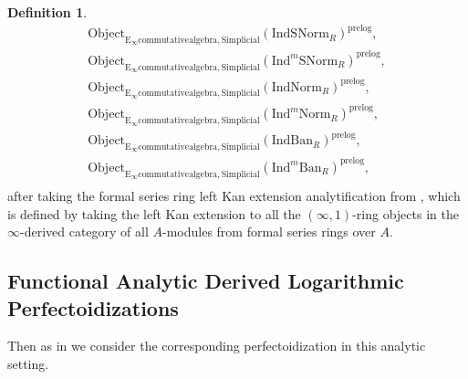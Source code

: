 \documentclass[11pt]{book}
\theoremstyle{definition}
\newtheorem{definition}[theorem]{Definition}
\numberwithin{equation}{section}
\begin{document}
\begin{definition}
\begin{align}
\mathrm{Object}_{\mathrm{E}_\infty\mathrm{commutativealgebra},\mathrm{Simplicial}}(\mathrm{IndSNorm}_R)^{\text{prelog}},\\
\mathrm{Object}_{\mathrm{E}_\infty\mathrm{commutativealgebra},\mathrm{Simplicial}}(\mathrm{Ind}^m\mathrm{SNorm}_R)^{\text{prelog}},\\
\mathrm{Object}_{\mathrm{E}_\infty\mathrm{commutativealgebra},\mathrm{Simplicial}}(\mathrm{IndNorm}_R)^{\text{prelog}},\\
\mathrm{Object}_{\mathrm{E}_\infty\mathrm{commutativealgebra},\mathrm{Simplicial}}(\mathrm{Ind}^m\mathrm{Norm}_R)^{\text{prelog}},\\
\mathrm{Object}_{\mathrm{E}_\infty\mathrm{commutativealgebra},\mathrm{Simplicial}}(\mathrm{IndBan}_R)^{\text{prelog}},\\
\mathrm{Object}_{\mathrm{E}_\infty\mathrm{commutativealgebra},\mathrm{Simplicial}}(\mathrm{Ind}^m\mathrm{Ban}_R)^{\text{prelog}},\\
\end{align}
after taking the formal series ring left Kan extension analytification from \cite[Section 4.2]{BBM}, which is defined by taking the left Kan extension to all the $(\infty,1)$-ring objects in the $\infty$-derived category of all $A$-modules from formal series rings over $A$.
\end{definition}

\newpage

\subsection{Functional Analytic Derived Logarithmic Perfectoidizations}

\indent Then as in \cite[Definition 8.2]{12BS} we consider the corresponding perfectoidization in this analytic setting. 
\end{document}
